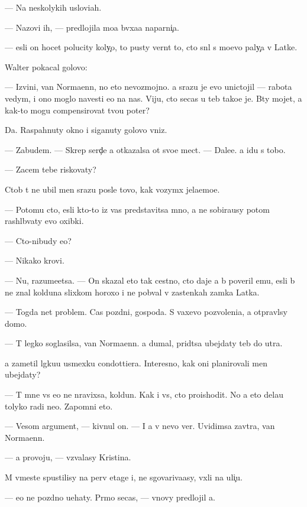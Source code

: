 \documentclass[10pt]{book}
\begin{document}
— Na neskolykih uslovi{\y}ah.

— Nazovi ih, — predlojila mo{\y}a b{\yi}vxa{\y}a naparni{\c}a.

— {\Y}esli on hocet polucity koly{\c}o, to pusty vern{\e}t to, cto sn{\ia}l s mo{\y}evo paly{\c}a v Latke.

Walter pokacal golovo{\y}:

— Izvini, van Normaenn, no eto nevozmojno. {\Y}a srazu je {\y}evo unictojil — rabota vedym{\yi}, i ono moglo navesti {\y}e{\y}o na nas. Viju, cto se{\y}cas u teb{\ia} tako{\y}e je. B{\yi}ty mojet, {\y}a kak-to mogu compensirovat{\y} tvo{\y}u poter{\io}?

Da. Raspahnuty okno i siganuty golovo{\y} vniz.

— Zabudem. — Skrep{\ia} serd{\c}e {\y}a otkazalsa ot svo{\y}e{\y} mect{\yi}. — Dale{\y}e. {\Y}a idu s tobo{\y}.

— Zacem tebe riskovaty?

Ctob{\yi} t{\yi} ne ubil men{\ia} srazu posle tovo, kak vozym{\e}x jela{\y}emo{\y}e.

— Potomu cto, {\y}esli kto-to iz vas predstavitsa mno{\y}, {\y}a ne sobira{\y}usy potom rashl{\e}b{\yi}vaty {\y}evo oxibki.

— Cto-nibudy {\y}e{\x}o?

— Nikako{\y} krovi.

— Nu, razume{\y}etsa. — On skazal eto tak cestno, cto daje {\y}a b{\yi} poveril {\y}emu, {\y}esli b{\yi} ne znal kolduna slixkom horoxo i ne pob{\yi}val v zastenkah zamka Latka.

— Togda net problem. Cas pozdni{\y}, gospoda. S vaxevo pozvoleni{\y}a, {\y}a otpravl{\io}sy domo{\y}.

— T{\yi} legko soglasilsa, van Normaenn. {\Y}a dumal, prid{\e}tsa ubejdaty teb{\ia} do utra.

{\Y}a zametil l{\e}gku{\y}u usmexku condottiera. Interesno, kak oni planirovali men{\ia} ubejdaty?

— T{\yi} mne vs{\e} {\y}e{\x}o ne nravixsa, koldun. Kak i vs{\e}, cto proishodit. No {\y}a eto dela{\y}u tolyko radi ne{\y}o. Zapomni eto.

— Vesom{\yi}{\y} argument, — kivnul on. — I {\y}a v nevo ver{\io}. Uvidimsa zavtra, van Normaenn.

— {\Y}a provoju, — v{\yi}zvalasy Kristina.

M{\yi} vmeste spustilisy na perv{\yi}{\y} etage i, ne sgovariva{\y}asy, v{\yi}xli na uli{\c}u.

— {\Y}e{\x}o ne pozdno u{\y}ehaty. Pr{\ia}mo se{\y}cas, — vnovy predlojil {\y}a.
\end{document}
